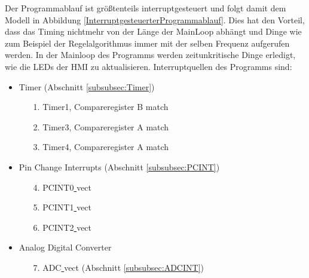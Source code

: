 \documentclass[a4paper, 11pt]{report}
\begin{document}
Der Programmablauf ist größtenteils interruptgesteuert und folgt damit dem Modell in Abbildung \ref{InterruptgesteuerterProgrammablauf}.
			Dies hat den Vorteil, dass das Timing nichtmehr von der Länge der MainLoop abhängt und Dinge wie zum  Beispiel der Regelalgorithmus immer mit der selben Frequenz aufgerufen werden.
			In der Mainloop des Programms werden zeitunkritische Dinge erledigt, wie die LEDs der HMI zu aktualisieren.
			Interruptquellen des Programms sind:
			\begin{itemize}
				\item Timer  (Abschnitt \ref{subsubsec:Timer})
				\begin{itemize}
					\item[1.] Timer1, Compareregister B match
					\item[2.] Timer3, Compareregister A match
					\item[3.] Timer4, Compareregister A match
				\end{itemize}
				\item Pin Change Interrupts (Abschnitt \ref{subsubsec:PCINT})
				\begin{itemize}
					\item[4.] PCINT0\underline{ }vect
					\item[5.] PCINT1\underline{ }vect
					\item[6.] PCINT2\underline{ }vect
				\end{itemize}
				\item Analog Digital Converter
				\begin{itemize}
					\item[7.] ADC\underline{ }vect  (Abschnitt \ref{subsubsec:ADCINT})
				\end{itemize}

			\end{itemize}
\end{document}
